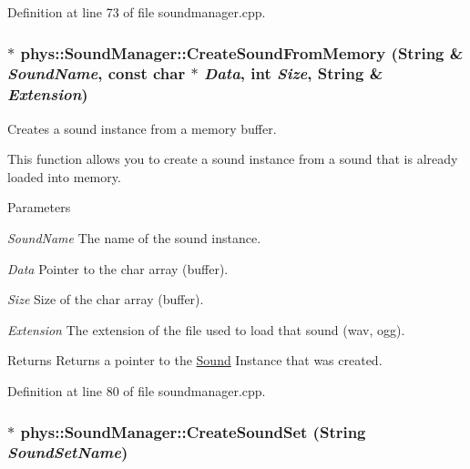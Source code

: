 Definition at line 73 of file soundmanager.cpp.

\hypertarget{classphys_1_1SoundManager_aa039c3d7a5ee961be0934a58fd3826fa}{
\subsubsection[{CreateSoundFromMemory}]{ $\ast$ phys::SoundManager::CreateSoundFromMemory ({\bf String} \& {\em SoundName}, \/  const char $\ast$ {\em Data}, \/  int {\em Size}, \/  {\bf String} \& {\em Extension})}}
\label{d1/dc4/classphys_1_1SoundManager_aa039c3d7a5ee961be0934a58fd3826fa}


Creates a sound instance from a memory buffer. 

This function allows you to create a sound instance from a sound that is already loaded into memory. 
\begin{DoxyParams}{Parameters}
\item[{\em SoundName}]The name of the sound instance. \item[{\em Data}]Pointer to the char array (buffer). \item[{\em Size}]Size of the char array (buffer). \item[{\em Extension}]The extension of the file used to load that sound (wav, ogg). \end{DoxyParams}
\begin{DoxyReturn}{Returns}
Returns a pointer to the \hyperlink{classphys_1_1Sound}{Sound} Instance that was created. 
\end{DoxyReturn}


Definition at line 80 of file soundmanager.cpp.

\hypertarget{classphys_1_1SoundManager_afccb11a6f6d9aa9768a185febb0af45a}{
\subsubsection[{CreateSoundSet}]{ $\ast$ phys::SoundManager::CreateSoundSet ({\bf String} {\em SoundSetName})}}
\label{d1/dc4/classphys_1_1SoundManager_afccb11a6f6d9aa9768a185febb0af45a}


